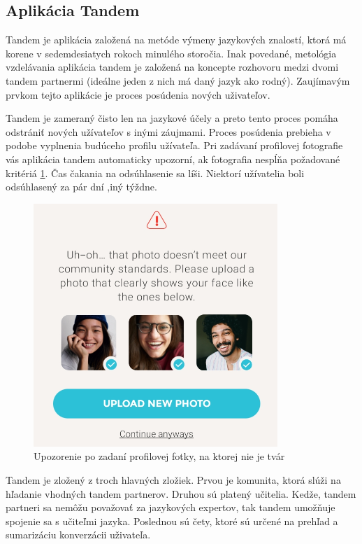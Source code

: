 \documentclass[10pt,oneside,slovak,a4paper]{article}
\begin{document}
\subsection{Aplikácia Tandem} %
Tandem je aplikácia založená na metóde výmeny jazykových znalostí, ktorá má korene v sedemdesiatych rokoch minulého storočia. Inak povedané, metológia vzdelávania aplikácia tandem je založená na koncepte rozhovoru medzi dvomi tandem partnermi (ideálne jeden z nich má daný jazyk ako rodný).
Zaujímavým prvkom tejto aplikácie je proces posúdenia nových uživateľov.\cite{tandem}

 Tandem je zameraný čisto len na jazykové účely a preto tento proces pomáha odstrániť nových užívateľov s inými záujmami. Proces posúdenia prebieha v podobe vyplnenia budúceho profilu užívateľa. Pri zadávaní profilovej fotografie vás aplikácia tandem automaticky upozorní, ak fotografia nespĺňa požadované kritériá \ref{tandem-obmedzenia}. Čas čakania na odsúhlasenie sa líši. Niektorí užívatelia boli odsúhlasený za pár dní ,iný týždne.\\

\begin{figure}[h] %
\centering
\includegraphics{tandem2.png}
\caption{Upozorenie po zadaní profilovej fotky, na ktorej nie je tvár}
\label{tandem-obmedzenia}
\end{figure}

Tandem je zložený z troch hlavných zložiek. Prvou je komunita, ktorá slúži na hľadanie vhodných tandem partnerov. Druhou sú platený učitelia. Kedže, tandem partneri sa nemôžu považovať za jazykových expertov, tak tandem umožňuje spojenie sa s učiteľmi jazyka. Poslednou sú čety, ktoré sú určené na prehľad a sumarizáciu konverzácii uživateľa.
\\
\end{document}
